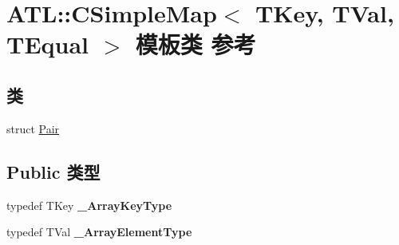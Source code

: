 \hypertarget{class_a_t_l_1_1_c_simple_map}{}\section{A\+TL\+:\+:C\+Simple\+Map$<$ T\+Key, T\+Val, T\+Equal $>$ 模板类 参考}
\label{class_a_t_l_1_1_c_simple_map}
\subsection*{类}
\begin{DoxyCompactItemize}
\item 
struct \hyperlink{struct_a_t_l_1_1_c_simple_map_1_1_pair}{Pair}
\end{DoxyCompactItemize}
\subsection*{Public 类型}
\begin{DoxyCompactItemize}
\item 
\mbox{\label{class_a_t_l_1_1_c_simple_map_a736e5ebcc0dfcf1db504ecfb7e657587}} 
typedef T\+Key {\bfseries \+\_\+\+Array\+Key\+Type}
\item 
\mbox{\label{class_a_t_l_1_1_c_simple_map_a86727345c408bb3d039268c0d4129b8f}} 
typedef T\+Val {\bfseries \+\_\+\+Array\+Element\+Type}
\end{DoxyCompactItemize}

